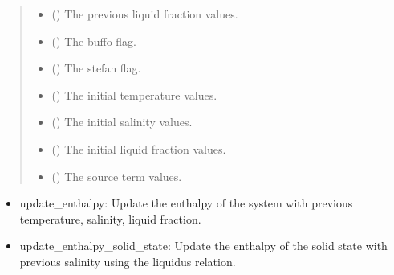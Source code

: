\documentclass[a4paper,11pt,english,openany]{sphinxmanual}
\begin{document}
\begin{fulllineitems}
\begin{quote}
\begin{description}
\begin{itemize}
\item {} 
\sphinxAtStartPar
{} () \textendash{} The previous liquid fraction values.

\item {} 
\sphinxAtStartPar
{} () \textendash{} The buffo flag.

\item {} 
\sphinxAtStartPar
{} () \textendash{} The stefan flag.

\item {} 
\sphinxAtStartPar
{} () \textendash{} The initial temperature values.

\item {} 
\sphinxAtStartPar
{} () \textendash{} The initial salinity values.

\item {} 
\sphinxAtStartPar
{} () \textendash{} The initial liquid fraction values.

\item {} 
\sphinxAtStartPar
{} () \textendash{} The source term values.

\end{itemize}

\end{description}\end{quote}
\begin{description}
\begin{description}
\begin{itemize}
\item {} 
\sphinxAtStartPar
update\_enthalpy: Update the enthalpy of the system with previous temperature, salinity, liquid fraction.

\item {} 
\sphinxAtStartPar
update\_enthalpy\_solid\_state: Update the enthalpy of the solid state with previous salinity using the liquidus relation.


\end{itemize}
\end{description}
\end{description}
\end{fulllineitems}
\end{document}
